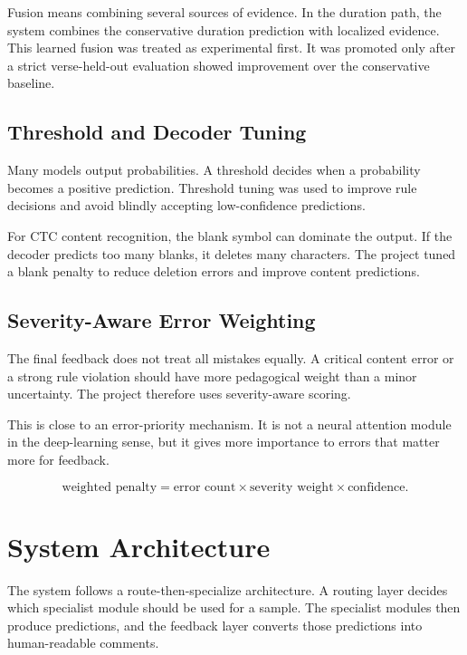 \documentclass[12pt,a4paper]{report}
\begin{document}
Fusion means combining several sources of evidence. In the duration path, the
system combines the conservative duration prediction with localized evidence.
This learned fusion was treated as experimental first. It was promoted only
after a strict verse-held-out evaluation showed improvement over the
conservative baseline.

\subsection{Threshold and Decoder Tuning}

Many models output probabilities. A threshold decides when a probability becomes
a positive prediction. Threshold tuning was used to improve rule decisions and
avoid blindly accepting low-confidence predictions.

For CTC content recognition, the blank symbol can dominate the output. If the
decoder predicts too many blanks, it deletes many characters. The project tuned
a blank penalty to reduce deletion errors and improve content predictions.

\subsection{Severity-Aware Error Weighting}

The final feedback does not treat all mistakes equally. A critical content error
or a strong rule violation should have more pedagogical weight than a minor
uncertainty. The project therefore uses severity-aware scoring.

This is close to an error-priority mechanism. It is not a neural attention
module in the deep-learning sense, but it gives more importance to errors that
matter more for feedback.

\begin{equation}
\text{weighted penalty}
= \text{error count} \times \text{severity weight} \times \text{confidence}.
\end{equation}

\section{System Architecture}

The system follows a route-then-specialize architecture. A routing layer decides
which specialist module should be used for a sample. The specialist modules then
produce predictions, and the feedback layer converts those predictions into
human-readable comments.
\end{document}
